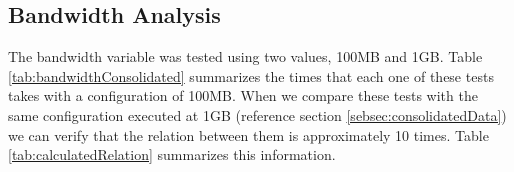 \subsection{Bandwidth Analysis}
\label{subsec:bandwidthAnalysis}

The bandwidth variable was tested using two values, 100MB and 1GB. Table \ref{tab:bandwidthConsolidated} summarizes the times that each one of these tests takes with a configuration of 100MB. When we compare these tests with the same configuration executed at 1GB (reference section \ref{sebsec:consolidatedData}) we can verify that the relation between them is approximately 10 times. Table \ref{tab:calculatedRelation} summarizes this information. 

